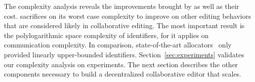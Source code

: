 The complexity analysis reveals the improvements brought by \LSEQ as well as
their cost.  \LSEQ sacrifices on its worst case complexity to improve on other
editing behaviors that are considered likely in collaborative editing. The most
important result is the polylogarithmic space complexity of identifiers, for it
applies on communication complexity. In comparison, state-of-the-art
allocators~\cite{preguica2009commutative, weiss2009logoot} only provided
linearly upper-bounded identifiers. Section~\ref{sec:experiments} validates our
complexity analysis on experiments. The next section describes the other
components necessary to build a decentralized collaborative editor that scales.



